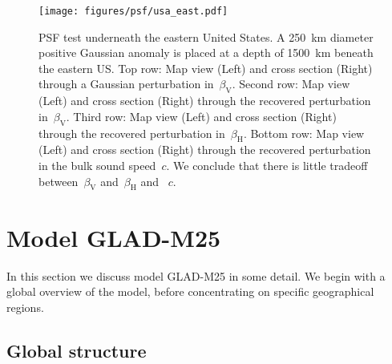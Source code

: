 \documentclass[extra,mreferee]{gji}
\begin{document}
\begin{figure}
  \centering
  \texttt{[image: figures/psf/usa\_east.pdf]}
  \caption{\small{PSF test underneath the eastern United States.
    A 250~km diameter positive Gaussian anomaly is placed at a depth of 1500~km beneath the eastern US.
  Top row: Map view (Left) and cross section (Right) through a Gaussian perturbation in~$\beta_\mathrm{V}$.
  Second row: Map view (Left) and cross section (Right) through the recovered perturbation in~$\beta_\mathrm{V}$.
  Third row: Map view (Left) and cross section (Right) through the recovered perturbation in~$\beta_\mathrm{H}$.
  Bottom row: Map view (Left) and cross section (Right) through the recovered perturbation in the bulk sound speed~$c$. We conclude that there is little tradeoff between~$\beta_\mathrm{V}$ and~$\beta_\mathrm{H}$ and ~$c$.
  }}
  \label{fig:psf_usa_east}
\end{figure}


\section{Model GLAD-M25}
\label{section:model}

In this section we discuss model GLAD-M25 in some detail.
We begin with a global overview of the model, before concentrating on
specific geographical regions.

\subsection{Global structure}
\end{document}
